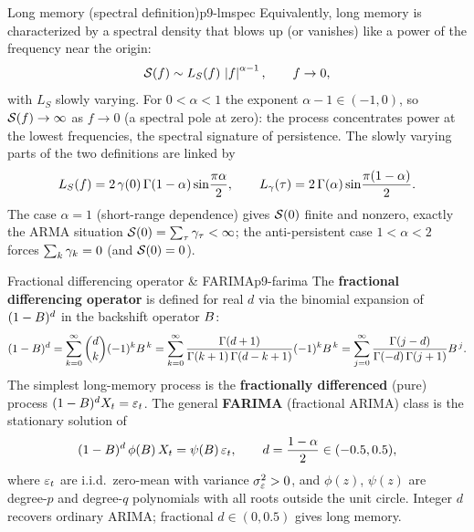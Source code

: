 \begin{definition}{Long memory (spectral definition)}{p9-lmspec}
Equivalently, long memory is characterized by a spectral density that blows up
(or vanishes) like a power of the frequency near the origin:
\[
\mathcal{S}(f) \sim L_S(f)\,\left\lvert f \right\rvert^{\alpha-1},\qquad f\to0 ,
\]
with $L_S$ slowly varying. For $0<\alpha<1$ the exponent $\alpha-1\in(-1,0)$, so
$\mathcal{S}(f)\to\infty$ as $f\to0$ (a spectral pole at zero): the process concentrates
power at the lowest frequencies, the spectral signature of persistence. The
slowly varying parts of the two definitions are linked by
\[
L_S(f) = 2\,\gamma(0)\,\Gamma(1-\alpha)\sin\!\frac{\pi\alpha}{2},\qquad
L_\gamma(\tau) = 2\,\Gamma(\alpha)\sin\!\frac{\pi(1-\alpha)}{2}.
\]
The case $\alpha=1$ (short-range dependence) gives $\mathcal{S}(0)$ finite and nonzero,
exactly the ARMA situation $\mathcal{S}(0)=\sum_\tau\gamma_\tau<\infty$; the
anti-persistent case $1<\alpha<2$ forces $\sum_k\gamma_k=0$ (and $\mathcal{S}(0)=0$).
\end{definition}

\begin{definition}{Fractional differencing operator \& FARIMA}{p9-farima}
The \textbf{fractional differencing operator} is defined for real $d$ via the
binomial expansion of $(1-B)^d$ in the backshift operator $B$:
\[
(1-B)^d
= \sum_{k=0}^{\infty}\binom{d}{k}(-1)^k B^{\,k}
= \sum_{k=0}^{\infty}\frac{\Gamma(d+1)}{\Gamma(k+1)\,\Gamma(d-k+1)}(-1)^k B^{\,k}
= \sum_{j=0}^{\infty}\frac{\Gamma(j-d)}{\Gamma(-d)\,\Gamma(j+1)}B^{\,j}.
\]
The simplest long-memory process is the \textbf{fractionally differenced} (pure)
process $(1-B)^d X_t=\varepsilon_t$. The general \textbf{FARIMA} (fractional ARIMA)
class is the stationary solution of
\[
(1-B)^d\,\phi(B)\,X_t = \psi(B)\,\varepsilon_t,
\qquad d=\frac{1-\alpha}{2}\in(-0.5,0.5),
\]
where $\varepsilon_t$ are i.i.d.\ zero-mean with variance $\sigma_\varepsilon^2>0$, and
$\phi(z)$, $\psi(z)$ are degree-$p$ and degree-$q$ polynomials with all roots
outside the unit circle. Integer $d$ recovers ordinary ARIMA; fractional
$d\in(0,0.5)$ gives long memory.
\end{definition}

